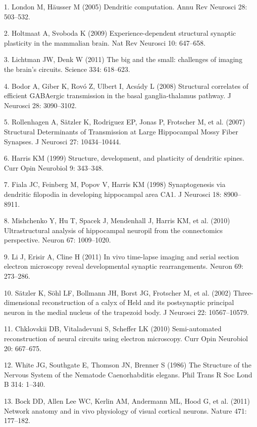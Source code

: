 \documentclass{article}
\begin{document}
\begin{hangpars}\small
1. London M, Häusser M (2005) Dendritic computation. Annu Rev Neurosci 28: 503–532.

2. Holtmaat A, Svoboda K (2009) Experience-dependent structural synaptic plasticity in the mammalian brain. Nat Rev Neurosci 10: 647–658.

3. Lichtman JW, Denk W (2011) The big and the small: challenges of imaging the brain’s circuits. Science 334: 618–623.

4. Bodor A, Giber K, Rovó Z, Ulbert I, Acsády L (2008) Structural correlates of efficient GABAergic transmission in the basal ganglia-thalamus pathway. J Neurosci 28: 3090–3102.

5. Rollenhagen A, Sätzler K, Rodriguez EP, Jonas P, Frotscher M, et al. (2007) Structural Determinants of Transmission at Large Hippocampal Mossy Fiber Synapses. J Neurosci 27: 10434–10444.

6. Harris KM (1999) Structure, development, and plasticity of dendritic spines. Curr Opin Neurobiol 9: 343–348.

7. Fiala JC, Feinberg M, Popov V, Harris KM (1998) Synaptogenesis via dendritic filopodia in developing hippocampal area CA1. J Neurosci 18: 8900–8911.

8. Mishchenko Y, Hu T, Spacek J, Mendenhall J, Harris KM, et al. (2010) Ultrastructural analysis of hippocampal neuropil from the connectomics perspective. Neuron 67: 1009–1020.

9. Li J, Erisir A, Cline H (2011) In vivo time-lapse imaging and serial section electron microscopy reveal developmental synaptic rearrangements. Neuron 69: 273–286.

10. Sätzler K, Söhl LF, Bollmann JH, Borst JG, Frotscher M, et al. (2002) Three-dimensional reconstruction of a calyx of Held and its postsynaptic principal neuron in the medial nucleus of the trapezoid body. J Neurosci 22: 10567–10579.

11. Chklovskii DB, Vitaladevuni S, Scheffer LK (2010) Semi-automated reconstruction of neural circuits using electron microscopy. Curr Opin Neurobiol 20: 667–675.

12. White JG, Southgate E, Thomson JN, Brenner S (1986) The Structure of the Nervous System of the Nematode Caenorhabditis elegans. Phil Trans R Soc Lond B 314: 1–340.

13. Bock DD, Allen Lee WC, Kerlin AM, Andermann ML, Hood G, et al. (2011) Network anatomy and in vivo physiology of visual cortical neurons. Nature 471: 177–182.


\end{hangpars}
\end{document}
